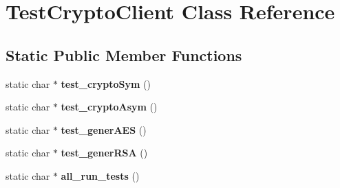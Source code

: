 \hypertarget{class_test_crypto_client}{\section{Test\-Crypto\-Client Class Reference}
\label{class_test_crypto_client}
}
\subsection*{Static Public Member Functions}
\begin{DoxyCompactItemize}
\item 
\hypertarget{class_test_crypto_client_a7cbdfc4a04d0d8ce34716e9317a03aea}{static char $\ast$ {\bfseries test\-\_\-crypto\-Sym} ()}\label{class_test_crypto_client_a7cbdfc4a04d0d8ce34716e9317a03aea}

\item 
\hypertarget{class_test_crypto_client_a38bbd587920535cda05512312d942848}{static char $\ast$ {\bfseries test\-\_\-crypto\-Asym} ()}\label{class_test_crypto_client_a38bbd587920535cda05512312d942848}

\item 
\hypertarget{class_test_crypto_client_a8fdda98ace50f9e3f87c548ccfe58a36}{static char $\ast$ {\bfseries test\-\_\-gener\-A\-E\-S} ()}\label{class_test_crypto_client_a8fdda98ace50f9e3f87c548ccfe58a36}

\item 
\hypertarget{class_test_crypto_client_a6d38ef1eee6a2a83313c95c43e8c3561}{static char $\ast$ {\bfseries test\-\_\-gener\-R\-S\-A} ()}\label{class_test_crypto_client_a6d38ef1eee6a2a83313c95c43e8c3561}

\item 
\hypertarget{class_test_crypto_client_ad9ee0d50f21f1d6923b0dcf9b75d8284}{static char $\ast$ {\bfseries all\-\_\-run\-\_\-tests} ()}\label{class_test_crypto_client_ad9ee0d50f21f1d6923b0dcf9b75d8284}

\end{DoxyCompactItemize}
